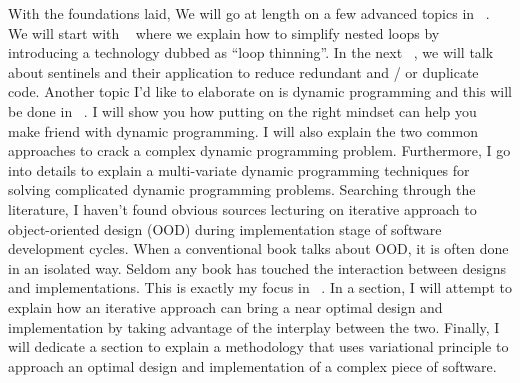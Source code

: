 With the foundations laid, We will go at length on a few advanced topics in ~.
We will start with ~ where we explain how to simplify nested loops by
introducing a technology dubbed as ``loop thinning''.
In the next ~, we will talk about sentinels and their application to reduce
redundant and / or duplicate code.
Another topic I'd like to elaborate on is dynamic programming and this will be done in ~.
I will show you how putting on the right mindset can help you make friend with dynamic programming.
I will also explain the two common approaches to crack a complex dynamic programming problem.
Furthermore, I go into details to explain a multi-variate dynamic programming techniques for
solving complicated dynamic programming problems.
Searching through the literature, I haven't found obvious sources lecturing on iterative approach to
object-oriented design (OOD) during implementation stage of software development cycles.
When a conventional book talks about OOD, it is often done in an isolated way.
Seldom any book has touched the interaction between designs and implementations.
This is exactly my focus in ~.
In a section, I will attempt to explain how an iterative approach can bring a near optimal
design and implementation by taking advantage of the interplay between the two.
Finally, I will dedicate a section to explain a methodology that uses variational principle to
approach an optimal design and implementation of a complex piece of software.
